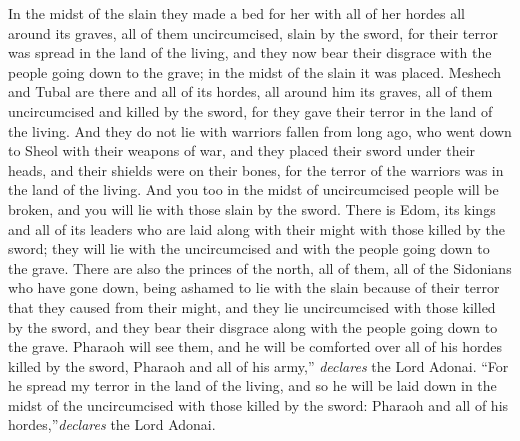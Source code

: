 \begin{biblechapter}
\verse In the midst of the slain they made a bed for her with all of her hordes all around its graves, all of them uncircumcised, slain by the sword, for their terror was spread in the land of the living, and they now bear their disgrace with the people going down to the grave; in the midst of the slain it was placed.
\verse Meshech and Tubal are there and all of its hordes, all around him its graves, all of them uncircumcised and killed by the sword, for they gave their terror in the land of the living.
\verse And they do not lie with warriors fallen from long ago, who went down to Sheol with their weapons of war, and they placed their sword under their heads, and their shields were on their bones, for the terror of the warriors was in the land of the living.
\verse And you too in the midst of uncircumcised people will be broken, and you will lie with those slain by the sword.
\verse There is Edom, its kings and all of its leaders who are laid along with their might with those killed by the sword; they will lie with the uncircumcised and with the people going down to the grave.
\verse There are also the princes of the north, all of them, all of the Sidonians who have gone down, being ashamed to lie with the slain because of their terror that they caused from their might, and they lie uncircumcised with those killed by the sword, and they bear their disgrace along with the people going down to the grave.
\verse Pharaoh will see them, and he will be comforted over all of his hordes killed by the sword, Pharaoh and all of his army,” \textit{declares} the Lord Adonai.
\verse “For he spread my terror in the land of the living, and so he will be laid down in the midst of the uncircumcised with those killed by the sword: Pharaoh and all of his hordes,”\textit{declares} the Lord Adonai.
\end{biblechapter}

